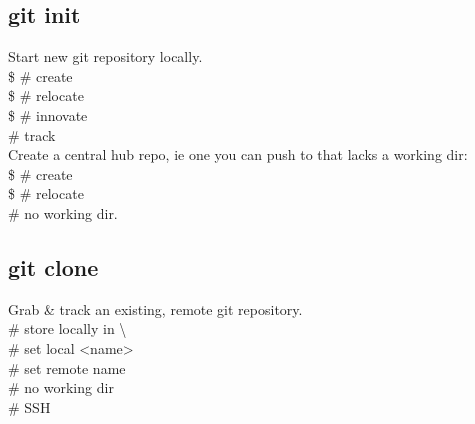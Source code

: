 \subsection*{git init}
Start new git repository locally. \\
\$  \# create \\
\$  \# relocate \\
\$  \# innovate \\
 \# track \\
Create a central hub repo, ie one you can push to that lacks a working dir: \\
\$  \# create \\
\$  \# relocate \\
 \# no working dir.\\


\subsection*{git clone}
Grab \& track an existing, remote git repository. \\
 \# store locally in \textbackslash \\
 \# set local <name> \\
 \# set remote name\\
 \# no working dir \\
 \# SSH\\


